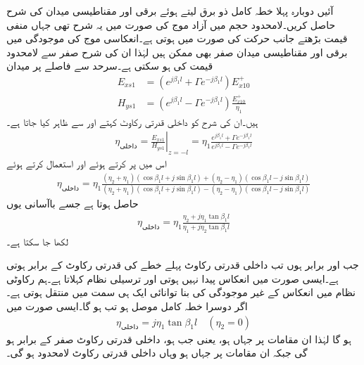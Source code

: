 آئیں دوبارہ پہلا خطہ کامل ذو برق لیتے ہوئے برقی اور مقناطیسی میدان کی شرح حاصل کریں۔لامحدود حجم میں آزاد موج کی صورت میں یہ شرح  تھی جہاں منفی قیمت بڑھتے  جانب حرکت کی صورت میں ہوتی ہے۔انعکاسی موج کی موجودگی میں برقی اور مقناطیسی میدان صفر بھی ممکن ہیں لہٰذا ان کی شرح صفر سے لامحدود قیمت کی ہو سکتی ہے۔سرحد سے  فاصلے پر میدان
 \begin{align*}
E_{xs1}&=\left(e^{j \beta_1 l}+ \Gamma e^{-j \beta_1 l} \right)E_{x10}^+ \\
H_{ys1}&=\left(e^{j \beta_1 l}- \Gamma e^{-j \beta_1 l} \right) \frac{E_{x10}^+}{\eta_1}
\end{align*}
ہیں۔ان کی شرح کو داخلی قدرتی رکاوٹ کہتے اور  سے ظاہر کیا جاتا ہے۔
\begin{align*}
\eta_{\text{داخلی}}=\left. \frac{E_{xs1}}{H_{ys1}} \right|_{z=-l}=\eta_1 \frac{e^{j \beta_1 l}+ \Gamma e^{-j \beta_1 l}}{e^{j \beta_1 l}- \Gamma e^{-j \beta_1 l}}
\end{align*}
اس میں  پر کرتے ہوئے اور   استعمال کرتے ہوئے
\begin{align*}
\eta_{\text{داخلی}}=\eta_1 \frac{(\eta_2+\eta_1)(\cos \beta_1 l +j \sin \beta_1 l)+(\eta_2-\eta_1)(\cos \beta_1 l -j \sin \beta_1 l)}{(\eta_2+\eta_1)(\cos \beta_1 l +j \sin \beta_1 l)-(\eta_2-\eta_1)(\cos \beta_1 l -j \sin \beta_1 l)}
\end{align*}
حاصل ہوتا ہے  جسے باآسانی یوں
\begin{align}\label{مساوات+موج_ترسیلی_نظام_داخلی_قدرتی_رکاوٹ_تعریف}
\eta_{\text{داخلی}}=\eta_1 \frac{\eta_2 +j \eta_1 \tan \beta_1 l}{\eta_1+j \eta_2 \tan \beta_1 l}
\end{align}
لکھا جا سکتا ہے۔

جب  اور  برابر ہوں تب داخلی قدرتی رکاوٹ  پہلے خطے کی قدرتی رکاوٹ  کے برابر ہوتی ہے۔ایسی صورت میں انعکاس پیدا نہیں ہوتی اور  ترسیلی نظام  کہلاتا ہے۔ہم رکاوٹی نظام میں انعکاس کے غیر موجودگی کی بنا توانائی ایک ہی سمت میں منتقل ہوتی ہے۔اگر دوسرا خطہ کامل موصل ہو تب  ہو گا۔ایسی صورت میں
\begin{align}
\eta_{\text{داخلی}}=j \eta_1 \tan \beta_1 l \quad (\eta_2=0)
\end{align}
ہو گا لہٰذا ان مقامات پر جہاں  ہو، یعنی جب  ہو، داخلی قدرتی رکاوٹ صفر کے برابر ہو گی جبکہ ان مقامات پر جہاں  ہو وہاں داخلی قدرتی رکاوٹ لامحدود ہو گی۔


